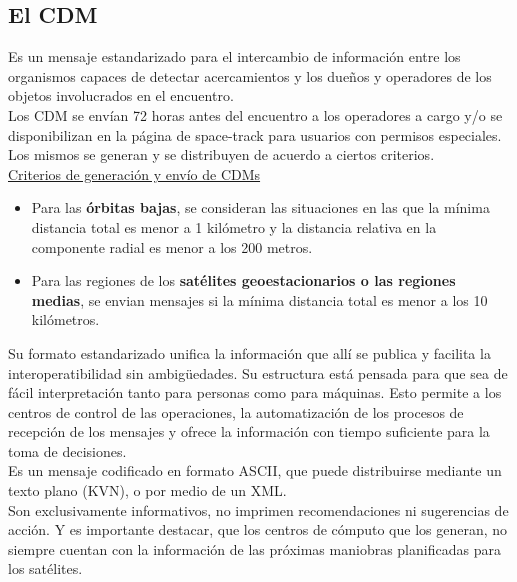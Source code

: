\subsection{El CDM}

Es un mensaje estandarizado para el intercambio de informaci\'on entre los organismos capaces de detectar acercamientos y los due\~nos y operadores de los objetos involucrados en el encuentro.\\
Los CDM se env\'ian 72 horas antes del encuentro a los operadores a cargo y/o se disponibilizan en la p\'agina de space-track para usuarios con permisos especiales.\\
Los mismos se generan y se distribuyen de acuerdo a ciertos criterios.\\


\underline{Criterios de generaci\'on y env\'io de CDMs}
\begin{itemize}
\item Para las {\bf{\'orbitas bajas}}, se consideran las situaciones en las que la m\'inima distancia total es menor a 1 kil\'ometro y la distancia relativa en la componente radial es menor a los 200 metros.\\

\item Para las regiones de los {\bf{sat\'elites geoestacionarios o las regiones medias}}, se envian mensajes si la m\'inima distancia total es menor a los 10 kil\'ometros.\\
\end{itemize}


Su formato estandarizado unifica la informaci\'on que all\'i se publica y facilita la interoperatibilidad sin ambig\"{u}edades. Su estructura est\'a pensada para que sea de f\'acil interpretaci\'on tanto para personas como para m\'aquinas. Esto permite a los centros de control de las operaciones, la automatizaci\'on de los procesos de recepci\'on de los mensajes y ofrece la informaci\'on con tiempo suficiente para la toma de decisiones.\\
Es un mensaje codificado en formato ASCII, que puede distribuirse mediante un texto plano (KVN), o por medio de un XML.\\

Son exclusivamente informativos, no imprimen recomendaciones ni sugerencias de acci\'on.
Y es importante destacar, que los centros de c\'omputo que los generan, no siempre cuentan con la informaci\'on de las pr\'oximas maniobras planificadas para los sat\'elites.\\

